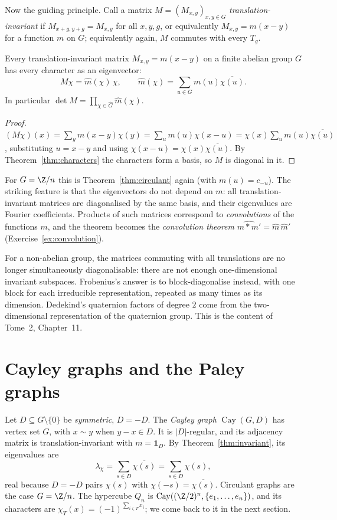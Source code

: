 Now the guiding principle. Call a matrix $M=(M_{x,y})_{x,y\in G}$ \emph{translation-invariant} if $M_{x+g,y+g}=M_{x,y}$ for all
$x,y,g$, or equivalently $M_{x,y}=m(x-y)$ for a function $m$ on $G$; equivalently again, $M$ commutes with every $T_g$.

\begin{theorem}\label{thm:invariant}
Every translation-invariant matrix $M_{x,y}=m(x-y)$ on a finite abelian group $G$ has every character as an eigenvector:
\[
M\chi=\hat m(\chi)\,\chi,\qquad\hat m(\chi)=\sum_{u\in G}m(u)\overline{\chi(u)}.
\]
In particular $\det M=\prod_{\chi\in\widehat G}\hat m(\chi)$.
\end{theorem}
\begin{proof}
$(M\chi)(x)=\sum_ym(x-y)\chi(y)=\sum_um(u)\chi(x-u)=\chi(x)\sum_um(u)\overline{\chi(u)}$, substituting $u=x-y$ and using
$\chi(x-u)=\chi(x)\overline{\chi(u)}$. By Theorem~\ref{thm:characters} the characters form a basis, so $M$ is diagonal in it.
\end{proof}

For $G=\Z/n$ this is Theorem~\ref{thm:circulant} again (with $m(u)=c_{-u}$). The striking feature is that the eigenvectors do not
depend on $m$: all translation-invariant matrices are diagonalised by the same basis, and their eigenvalues are Fourier
coefficients. Products of such matrices correspond to \emph{convolutions} of the functions $m$, and the theorem becomes the
\emph{convolution theorem} $\widehat{m*m'}=\hat m\,\hat m'$ (Exercise~\ref{ex:convolution}).

\begin{remark}
For a non-abelian group, the matrices commuting with all translations are no longer simultaneously diagonalisable: there are not
enough one-dimensional invariant subspaces. Frobenius's answer is to block-diagonalise instead, with one block for each
irreducible representation, repeated as many times as its dimension. Dedekind's quaternion factors of degree $2$ come from the
two-dimensional representation of the quaternion group. This is the content of Tome~2, Chapter~11.
\end{remark}

\section{Cayley graphs and the Paley graphs}

Let $D\subseteq G\setminus\{0\}$ be \emph{symmetric}, $D=-D$. The \emph{Cayley graph} $\operatorname{Cay}(G,D)$ has vertex set $G$,
with $x\sim y$ when $y-x\in D$. It is $|D|$-regular, and its adjacency matrix is translation-invariant with $m=\mathbf 1_D$. By
Theorem~\ref{thm:invariant}, its eigenvalues are
\[
\lambda_\chi=\sum_{s\in D}\overline{\chi(s)}=\sum_{s\in D}\chi(s),
\]
real because $D=-D$ pairs $\chi(s)$ with $\chi(-s)=\overline{\chi(s)}$. Circulant graphs are the case $G=\Z/n$. The hypercube
$Q_n$ is $\operatorname{Cay}((\Z/2)^n,\{e_1,\dots,e_n\})$, and its characters are $\chi_T(x)=(-1)^{\sum_{i\in T}x_i}$; we come back to
it in the next section.

